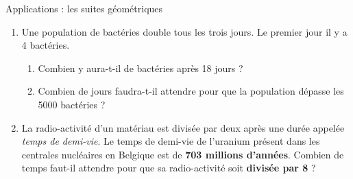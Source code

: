 



	\vspace{3em}
	\begin{center}
			{\Large Applications : les suites géométriques}
	\end{center}
	
	\vspace{3em}
	
	\begin{enumerate}
		\item 
			Une population de bactéries double tous les trois jours. Le premier jour il y a 4 bactéries.
			\begin{enumerate}
				\item Combien y aura-t-il de bactéries après 18 jours ?
				\item Combien de jours faudra-t-il attendre pour que la population dépasse les 5000 bactéries ?
			\end{enumerate}
			\vspace{3em}
			
		\item 
			La radio-activité d'un matériau est divisée par deux après une durée appelée \textit{temps de demi-vie}. Le temps de demi-vie de l'uranium présent dans les centrales nucléaires en Belgique est de \textbf{703 millions d'années}. Combien de temps faut-il attendre pour que sa radio-activité soit \textbf{divisée par 8} ?
			
		
	\end{enumerate}
	
